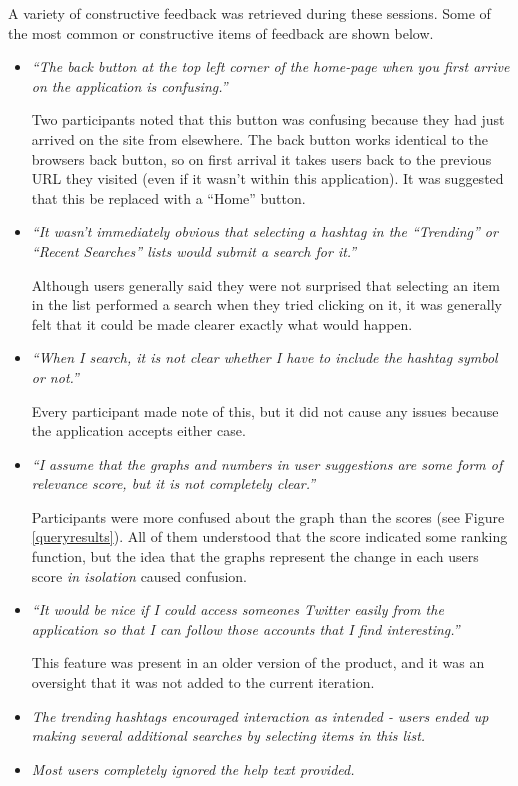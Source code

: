 \documentclass{l4proj}
\begin{document}
    A variety of constructive feedback was retrieved during these sessions. Some of the most common or constructive items of feedback are shown below.
    
\begin{itemize}

\item \textit{``The back button at the top left corner of the home-page when you first arrive on the application is confusing.''}
\par
Two participants noted that this button was confusing because they had just arrived on the site from elsewhere. The back button works identical to the browsers back button, so on first arrival it takes users back to the previous URL they visited (even if it wasn't within this application). It was suggested that this be replaced with a ``Home'' button.

\item \textit{``It wasn't immediately obvious that selecting a hashtag in the ``Trending'' or ``Recent Searches'' lists would submit a search for it.''}
\par
Although users generally said they were not surprised that selecting an item in the list performed a search when they tried clicking on it, it was generally felt that it could be made clearer exactly what would happen.

\item \textit{``When I search, it is not clear whether I have to include the hashtag symbol or not.''}
\par
Every participant made note of this, but it did not cause any issues because the application accepts either case.

\item \textit{``I assume that the graphs and numbers in user suggestions are some form of relevance score, but it is not completely clear.''}
\par
Participants were more confused about the graph than the scores (see Figure \ref{queryresults}). All of them understood that the score indicated some ranking function, but the idea that the graphs represent the change in each users score \textit{in isolation} caused confusion.

\item \textit{``It would be nice if I could access someones Twitter easily from the application so that I can follow those accounts that I find interesting.''}
\par
This feature was present in an older version of the product, and it was an oversight that it was not added to the current iteration.

\item \textit{The trending hashtags encouraged interaction as intended - users ended up making several additional searches by selecting items in this list.}

\item \textit{Most users completely ignored the help text provided.}

\end{itemize}
\end{document}
